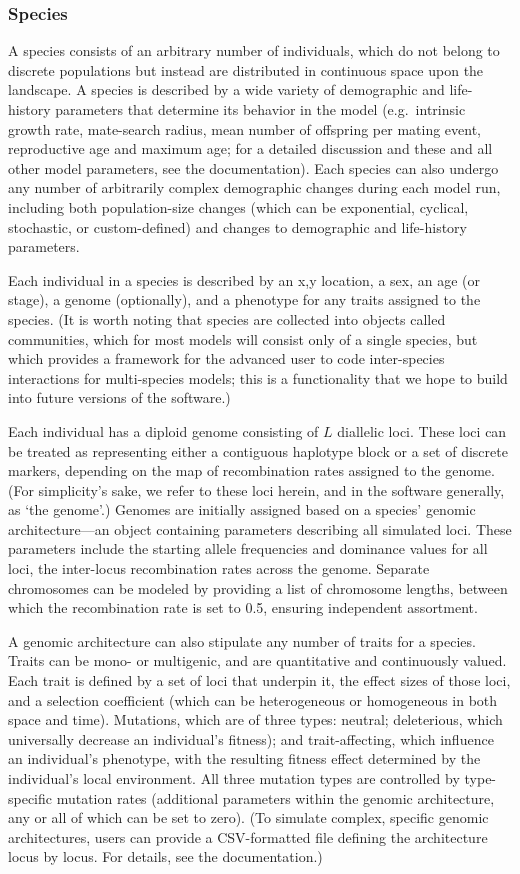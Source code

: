 ﻿\documentclass{article}
\begin{document}
\subsubsection{Species}
A species consists of an arbitrary number of individuals, which do not belong to
discrete populations but instead are distributed in continuous space upon the landscape.
A species is described by a wide variety of demographic and life-history parameters
that determine its behavior in the model (e.g.\ intrinsic growth rate, mate-search radius,
mean number of offspring per mating event, reproductive age and maximum age;
for a detailed discussion and these and all other model parameters, see the documentation).
Each species can also undergo any number of arbitrarily complex demographic changes during
each model run, including both population-size changes
(which can be exponential, cyclical, stochastic, or custom-defined)
and changes to demographic and life-history parameters.

Each individual in a species is described by an x,y location, a sex, an age (or stage),
a genome (optionally), and a phenotype for any traits assigned to the species.
(It is worth noting that species are collected into objects called communities,
which for most models will consist only of a single species,
but which provides a framework for the advanced user 
to code inter-species interactions for multi-species models;
this is a functionality that we hope to build into future versions of the software.)

Each individual has a diploid genome consisting of $L$ diallelic loci.
These loci can be treated as representing either a contiguous haplotype block
or a set of discrete markers, depending on the map of recombination rates assigned to the genome.
(For simplicity's sake, we refer to these loci herein, and in the software generally, as `the genome'.)
Genomes are initially assigned based on a species' genomic architecture---an object containing
parameters describing all simulated loci.
These parameters include the starting allele frequencies and dominance values for all loci,
the inter-locus recombination rates across the genome.
Separate chromosomes can be modeled by providing a list of chromosome lengths,
between which the recombination rate is set to 0.5, ensuring independent assortment.

A genomic architecture can also stipulate any number of traits for a species. Traits can be mono- or multigenic, and are quantitative and continuously valued.
Each trait is defined by a set of loci that underpin it, the effect sizes of those loci,
and a selection coefficient (which can be heterogeneous or homogeneous in both space and time).
Mutations, which are of three types: neutral; deleterious, which universally decrease an individual's fitness); 
and trait-affecting, which influence an individual's phenotype, with the resulting fitness effect
determined by the individual's local environment.
All three mutation types are controlled by type-specific mutation rates 
(additional parameters within the genomic architecture, any or all of which can be set to zero).
(To simulate complex, specific genomic architectures, users can provide a
CSV-formatted file defining the architecture locus by locus.
For details, see the documentation.)
\end{document}
